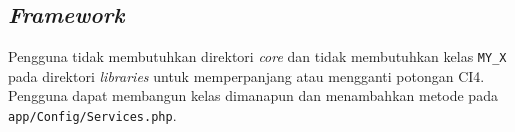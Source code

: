\iffalse
\subsection{\textit{Events}}
\textit{Events} merupakan pembaharuan dari \textit{Hooks}. Pengguna harus mengubah
\begin{center}
	\verb|$hook['post_controller_constructor']|
\end{center} 
menjadi 
\begin{center} \verb|Events::on('post_controller_constructor', ['MyClass', 'MyFunction']);|
\end{center}
Dan menambahkan \textit{namespace} \verb|CodeIgniter\Events\Events;|. 
\fi

\subsection{\textit{Framework}}
Pengguna tidak membutuhkan direktori \textit{core} dan tidak membutuhkan kelas \verb|MY_X| pada direktori \textit{libraries} untuk memperpanjang atau mengganti potongan CI4. Pengguna dapat membangun kelas dimanapun dan menambahkan metode pada \verb|app/Config/Services.php|.
